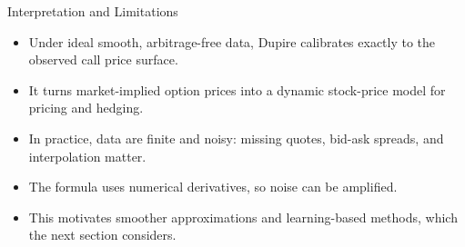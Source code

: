 \documentclass[aspectratio=169]{beamer}
\begin{document}
\begin{frame}{Interpretation and Limitations}
  \begin{itemize}
    \item Under ideal smooth, arbitrage-free data, Dupire calibrates exactly to the observed call price surface.
    \item It turns market-implied option prices into a dynamic stock-price model for pricing and hedging.
    \item In practice, data are finite and noisy: missing quotes, bid-ask spreads, and interpolation matter.
    \item The formula uses numerical derivatives, so noise can be amplified.
    \item This motivates smoother approximations and learning-based methods, which the next section considers.
  \end{itemize}
\end{frame}
\end{document}
